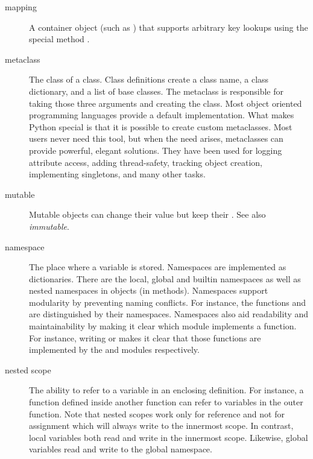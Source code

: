\begin{description}
\item[mapping]
A container object (such as ) that supports arbitrary key
lookups using the special method .

\item[metaclass]
The class of a class.  Class definitions create a class name, a class
dictionary, and a list of base classes.  The metaclass is responsible
for taking those three arguments and creating the class.  Most object
oriented programming languages provide a default implementation.  What
makes Python special is that it is possible to create custom
metaclasses.  Most users never need this tool, but when the need
arises, metaclasses can provide powerful, elegant solutions.  They
have been used for logging attribute access, adding thread-safety,
tracking object creation, implementing singletons, and many other
tasks.

\item[mutable]
Mutable objects can change their value but keep their .
See also \emph{immutable}.

\item[namespace]
The place where a variable is stored.  Namespaces are implemented as
dictionaries.  There are the local, global and builtin namespaces
as well as nested namespaces in objects (in methods).  Namespaces support
modularity by preventing naming conflicts.  For instance, the
functions  and  are
distinguished by their namespaces.  Namespaces also aid readability
and maintainability by making it clear which module implements a
function.  For instance, writing  or
{} makes it clear that those functions are
implemented by the 
and  modules
respectively.

\item[nested scope]
The ability to refer to a variable in an enclosing definition.  For
instance, a function defined inside another function can refer to
variables in the outer function.  Note that nested scopes work only
for reference and not for assignment which will always write to the
innermost scope.  In contrast, local variables both read and write in
the innermost scope.  Likewise, global variables read and write to the
global namespace.


\end{description}
